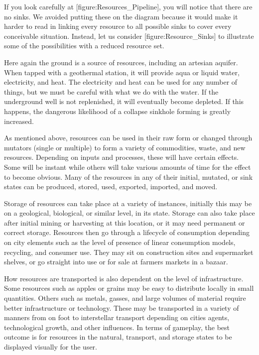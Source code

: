 If you look carefully at [figure:Resources_Pipeline], you will notice that there are no sinks. We avoided putting these on the diagram because it would make it harder to read in linking every resource to all possible sinks to cover every conceivable situation. Instead, let us consider [figure:Resource_Sinks] to illustrate some of the possibilities with a reduced resource set.

    {}

Here again the ground is a source of resources, including an artesian aquifer. When tapped with a geothermal station, it will provide aqua or liquid water, electricity, and heat. The electricity and heat can be used for any number of things, but we must be careful with what we do with the water. If the underground well is not replenished, it will eventually become depleted. If this happens, the dangerous likelihood of a collapse sinkhole forming is greatly increased.

As mentioned above, resources can be used in their raw form or changed through mutators (single or multiple) to form a variety of commodities, waste, and new resources. Depending on inputs and processes, these will have certain effects. Some will be instant while others will take various amounts of time for the effect to become obvious. Many of the resources in any of their initial, mutated, or sink states can be produced, stored, used, exported, imported, and moved.

Storage of resources can take place at a variety of instances, initially this may be on a geological, biological, or similar level, in its  state. Storage can also take place after initial mining or harvesting at this location, or it may need permanent or correct storage. Resources then go through a lifecycle of consumption depending on city elements such as the level of presence of linear consumption models, recycling, and consumer use. They may sit on construction sites and supermarket shelves, or go straight into use or for sale at farmers markets in a bazaar.

How resources are transported is also dependent on the level of infrastructure. Some resources such as apples or grains may be easy to distribute locally in small quantities. Others such as metals, gasses, and large volumes of material require better infrastructure or technology. These may be transported in a variety of manners from on foot to interstellar transport depending on cities agents, technological growth, and other influences. In terms of gameplay, the best outcome is for resources in the natural, transport, and storage states to be displayed visually for the user.

